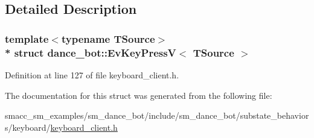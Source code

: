 \subsection{Detailed Description}
\subsubsection*{template$<$typename T\+Source$>$\\*
struct dance\+\_\+bot\+::\+Ev\+Key\+Press\+V$<$ T\+Source $>$}



Definition at line 127 of file keyboard\+\_\+client.\+h.



The documentation for this struct was generated from the following file\+:\begin{DoxyCompactItemize}
\item 
smacc\+\_\+sm\+\_\+examples/sm\+\_\+dance\+\_\+bot/include/sm\+\_\+dance\+\_\+bot/substate\+\_\+behaviors/keyboard/\hyperlink{keyboard__client_8h}{keyboard\+\_\+client.\+h}\end{DoxyCompactItemize}
